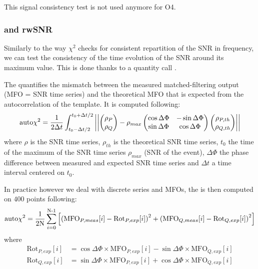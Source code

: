 This signal consistency test is not used anymore for O4. 

\subsubsection{\achi and rwSNR}
\label{sec:achi2}

Similarly to the way $\chi^2$ checks for consistent repartition of the SNR in frequency, we can test the consistency of the time evolution of the SNR around its maximum value.
This is done thanks to a quantity call \achi.

The \achi quantifies the mismatch between the measured matched-filtering output (MFO = SNR time series) and the theoretical MFO that is expected from the autocorrelation of the template.
It is computed following:
\begin{equation}
  \label{eq:achi2th}
  \textrm{auto$\chi^2$} = \frac{1}{2\Delta t} \int_{t_0-\Delta t/2}^{t_0+\Delta t/2}\left|\left| \begin{pmatrix} \rho_P \\ \rho_Q \end{pmatrix}
      - \rho_{max} \begin{pmatrix} \cos\Delta\Phi & -\sin\Delta\Phi \\ \sin\Delta\Phi & \cos\Delta\Phi \end{pmatrix} \begin{pmatrix} \rho_{P,th} \\ \rho_{Q,th} \end{pmatrix} \right| \right|
\end{equation}
where $\rho$ is the SNR time series, $\rho_{th}$ is the theoretical SNR time series, $t_0$ the time of the maximum of the SNR time series $\rho_{max}$ (SNR of the event), $\Delta\Phi$ the phase difference between measured and expected SNR time series and $\Delta t$ a time interval centered on $t_0$.

In practice however we deal with discrete series and MFOs, the \achi is then computed on $400$ points following:
\begin{equation}
\label{eq:achi2}
    \textrm{auto$\chi^2$} = \frac{1}{2\textrm{N}} \sum_{i=0}^{\textrm{N-1}} \left[  \left( \textrm{MFO}_{P,meas}[i] - \textrm{Rot}_{P,exp}[i] \right)^2 + \left( \textrm{MFO}_{Q,meas}[i] - \textrm{Rot}_{Q,exp}[i] \right)^2 \right]
\end{equation}
where
\begin{align}
  \textrm{Rot}_{P,exp}[i] &= \cos\Delta\Phi \times \textrm{MFO}_{P,exp}[i] - \sin\Delta\Phi \times \textrm{MFO}_{Q,exp}[i]\\
  \textrm{Rot}_{Q,exp}[i] &= \sin\Delta\Phi \times \textrm{MFO}_{P,exp}[i] + \cos\Delta\Phi \times \textrm{MFO}_{Q,exp}[i]
\end{align}

